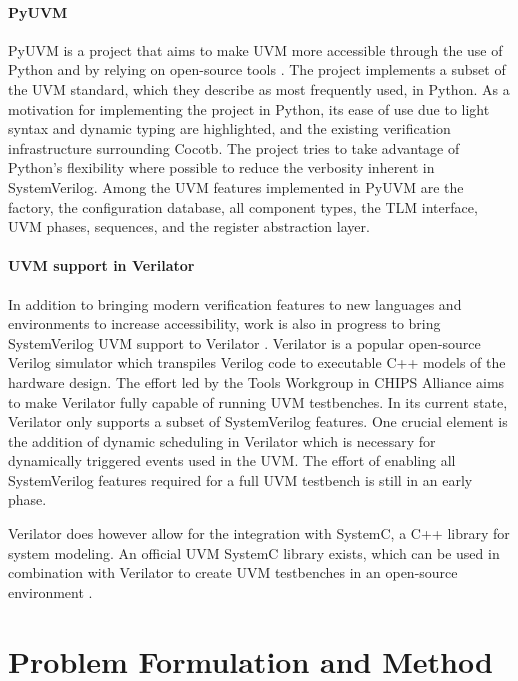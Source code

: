 \subsubsection{PyUVM} %

PyUVM is a project that aims to make UVM more accessible through the use of Python and by relying on open-source
tools \cite{pyuvm}. The project implements a subset of the UVM standard, which they describe as most frequently used,
in Python. As a motivation for implementing the project in Python, its ease of use due to light syntax and dynamic
typing are highlighted, and the existing verification infrastructure surrounding Cocotb. The project tries to take
advantage of Python's flexibility where possible to reduce the verbosity inherent in SystemVerilog. Among the UVM
features implemented in PyUVM are the factory, the configuration database, all component types, the TLM interface,
UVM phases, sequences, and the register abstraction layer.

\subsubsection{UVM support in Verilator} %

In addition to bringing modern verification features to new languages and environments to increase accessibility,
work is also in progress to bring SystemVerilog UVM support to Verilator \cite{uvm_verilator}. Verilator is a popular
open-source
Verilog simulator which transpiles Verilog code to executable C++ models of the hardware design. The effort led by
the Tools Workgroup in CHIPS Alliance aims to make Verilator fully capable of running UVM testbenches. In its current
state, Verilator only supports a subset of SystemVerilog features. One crucial element is the addition of dynamic
scheduling in Verilator which is necessary for dynamically triggered events used in the UVM. The effort of enabling
all SystemVerilog features required for a full UVM testbench is still in an early phase.

Verilator does however allow for the integration with SystemC, a C++ library for system modeling. An official UVM
SystemC library exists, which can be used in combination with Verilator to create UVM testbenches in an open-source
environment \cite{Sasselli2023}.

\chapter{Problem Formulation and Method} %

